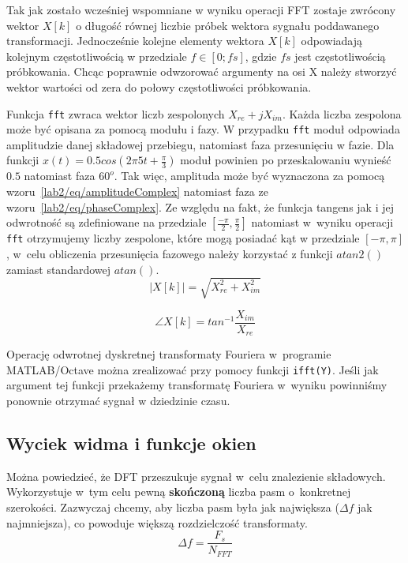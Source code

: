 Tak jak zostało wcześniej wspomniane w wyniku operacji FFT zostaje zwrócony wektor $X[k]$ o długość równej liczbie próbek wektora sygnału poddawanego transformacji. Jednocześnie kolejne elementy wektora $X[k]$ odpowiadają kolejnym częstotliwością w przedziale $f\in[0;fs]$, gdzie $fs$ jest częstotliwością próbkowania. Chcąc poprawnie odwzorować argumenty na osi X należy stworzyć wektor wartości od zera do połowy częstotliwości próbkowania.

Funkcja \texttt{fft} zwraca wektor liczb zespolonych $X_{re} + jX_{im}$. Każda liczba zespolona może być opisana za pomocą modułu i fazy. W przypadku \texttt{fft} moduł odpowiada amplitudzie danej składowej przebiegu, natomiast faza przesunięciu w fazie. Dla funkcji $x(t) = 0.5cos(2\pi 5t + \frac{\pi}{3})$ moduł powinien po przeskalowaniu wynieść $0.5$ natomiast faza $60^o$. Tak więc, amplituda może być wyznaczona za pomocą wzoru~\ref{lab2/eq/amplitudeComplex} natomiast faza ze wzoru~\ref{lab2/eq/phaseComplex}. Ze względu na fakt, że funkcja tangens jak i jej odwrotność są zdefiniowane na przedziale $[\frac{-\pi}{2}, \frac{\pi}{2}]$ natomiast w~wyniku operacji \texttt{fft} otrzymujemy liczby zespolone, które mogą posiadać kąt w przedziale $[-\pi, \pi]$, w~celu obliczenia przesunięcia fazowego należy korzystać z funkcji $atan2()$ zamiast standardowej $atan()$.
\begin{equation}\label{lab2/eq/amplitudeComplex}
	|X[k]| = \sqrt{X^2 _{re} + X^2 _{im}}
\end{equation}

\begin{equation}\label{lab2/eq/phaseComplex}
	\angle X[k] = tan^{-1} \frac{X_{im}}{X_{re}}
\end{equation}

Operację odwrotnej dyskretnej transformaty Fouriera w~programie MATLAB/Octave można zrealizować przy pomocy funkcji \texttt{ifft(Y)}. Jeśli jak argument tej funkcji przekażemy transformatę Fouriera w~wyniku powinniśmy ponownie otrzymać sygnał w dziedzinie czasu.


\subsection{Wyciek widma i funkcje okien}
Można powiedzieć, że DFT przeszukuje sygnał w~celu znalezienie składowych. Wykorzystuje w~tym celu pewną \textbf{skończoną} liczba pasm o~konkretnej szerokości. Zazwyczaj chcemy, aby liczba pasm była jak największa ($\Delta f$ jak najmniejsza), co powoduje większą rozdzielczość transformaty.
\begin{equation}\label{lab2/lst/frequencyResolution}
	\Delta f = \frac{F_s}{N_{FFT}}
\end{equation}

